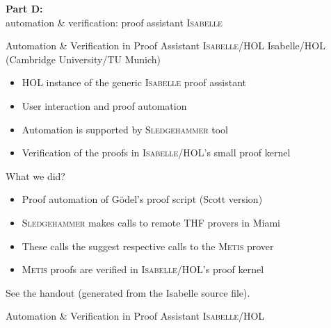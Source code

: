 
\begin{transitionframe}{} \Large \centering
\textbf{Part D:} \\[.5em]
\quad automation \& verification: proof assistant \textsc{Isabelle} \\[2em]
\end{transitionframe}



\begin{frame}{Automation \& Verification in Proof Assistant \textsc{Isabelle/HOL}} \large
Isabelle/HOL   (Cambridge University/TU Munich)
\begin{itemize}
\item HOL instance of the generic \textsc{Isabelle} proof assistant
\item User interaction and proof automation 
\item Automation is supported by \textsc{Sledgehammer} tool
\item Verification of the proofs in \textsc{Isabelle/HOL}'s small proof kernel
\end{itemize}
\vfill
What we did?
\begin{itemize}
\item Proof automation of G\"odel's proof script (Scott version)
\item \textsc{Sledgehammer} makes calls to remote THF provers in Miami
\item These calls the suggest respective calls to the \textsc{Metis} prover
\item \textsc{Metis} proofs are verified in \textsc{Isabelle/HOL}'s proof kernel
\end{itemize}
\vfill
See the handout (generated from the Isabelle source file).
\end{frame}


\begin{frame}{Automation \& Verification in Proof Assistant
    \textsc{Isabelle/HOL}} \large

\end{frame}